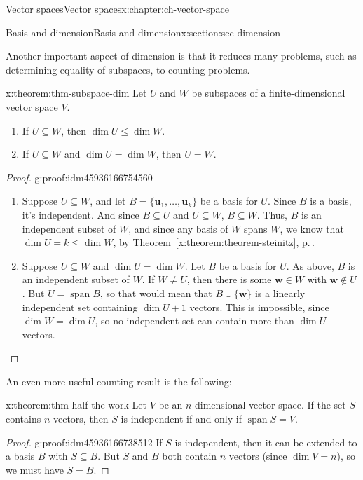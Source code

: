 \documentclass[oneside,10pt,]{book}
\newcommand{\xreffont}{\relax}
\numberwithin{equation}{section}
\newcommand{\spn}{\operatorname{span}}
\newcommand{\uu}{\mathbf{u}}
\newcommand{\ww}{\mathbf{w}}
\begin{document}
\begin{chapterptx}{Vector spaces}{}{Vector spaces}{}{}{x:chapter:ch-vector-space}
\begin{sectionptx}{Basis and dimension}{}{Basis and dimension}{}{}{x:section:sec-dimension}
\begin{itemize}[label=\textbullet]
\end{itemize}
Another important aspect of dimension is that it reduces many problems, such as determining equality of subspaces, to counting problems.%
\begin{theorem}{}{}{x:theorem:thm-subspace-dim}%
Let \(U\) and \(W\) be subspaces of a finite-dimensional vector space \(V\).%
\begin{enumerate}
\item{}If \(U\subseteq W\), then \(\dim U\leq \dim W\).%
\item{}If \(U\subseteq W\) and \(\dim U=\dim W\), then \(U=W\).%
\end{enumerate}
%
\end{theorem}
\begin{proof}{}{g:proof:idm45936166754560}
%
\begin{enumerate}
\item{}Suppose \(U\subseteq W\), and let \(B=\{\uu_1,\ldots, \uu_k\}\) be a basis for \(U\). Since \(B\) is a basis, it's independent. And since \(B\subseteq U\) and \(U\subseteq W\), \(B\subseteq W\). Thus, \(B\) is an independent subset of \(W\), and since any basis of \(W\) spans \(W\), we know that \(\dim U = k \leq \dim W\), by \hyperref[x:theorem:theorem-steinitz]{Theorem~{\xreffont\ref{x:theorem:theorem-steinitz}}, p.\,\pageref{x:theorem:theorem-steinitz}}.%
\item{}Suppose \(U\subseteq W\) and \(\dim U = \dim W\). Let \(B\) be a basis for \(U\). As above, \(B\) is an independent subset of \(W\). If \(W\neq U\), then there is some \(\ww\in W\) with \(\ww\notin U\). But \(U=\spn B\), so that would mean that \(B\cup \{\ww\}\) is a linearly independent set containing \(\dim U+1\) vectors. This is impossible, since \(\dim W=\dim U\), so no independent set can contain more than \(\dim U\) vectors.%
\end{enumerate}
%
\end{proof}
An even more useful counting result is the following:%
\begin{theorem}{}{}{x:theorem:thm-half-the-work}%
Let \(V\) be an \(n\)-dimensional vector space. If the set \(S\) contains \(n\) vectors, then \(S\) is independent if and only if \(\spn S=V\).%
\end{theorem}
\begin{proof}{}{g:proof:idm45936166738512}
If \(S\) is independent, then it can be extended to a basis \(B\) with \(S\subseteq B\). But \(S\) and \(B\) both contain \(n\) vectors (since \(\dim V=n\)), so we must have \(S=B\).%
\par

\end{proof}
\end{sectionptx}
\end{chapterptx}
\end{document}
